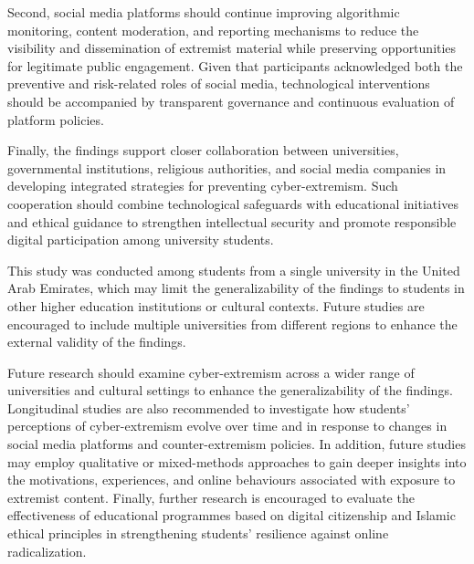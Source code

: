 \documentclass{NSP1}
\begin{document}
Second, social media platforms should continue improving algorithmic monitoring, content moderation, and reporting mechanisms to reduce the visibility and dissemination of extremist material while preserving opportunities for legitimate public engagement. Given that participants acknowledged both the preventive and risk-related roles of social media, technological interventions should be accompanied by transparent governance and continuous evaluation of platform policies.

Finally, the findings support closer collaboration between universities, governmental institutions, religious authorities, and social media companies in developing integrated strategies for preventing cyber-extremism. Such cooperation should combine technological safeguards with educational initiatives and ethical guidance to strengthen intellectual security and promote responsible digital participation among university students.

\par\medskip{}\smallskip

This study was conducted among students from a single university in the United Arab Emirates, which may limit the generalizability of the findings to students in other higher education institutions or cultural contexts. Future studies are encouraged to include multiple universities from different regions to enhance the external validity of the findings.

\par\medskip{}\smallskip

Future research should examine cyber-extremism across a wider range of universities and cultural settings to enhance the generalizability of the findings. Longitudinal studies are also recommended to investigate how students' perceptions of cyber-extremism evolve over time and in response to changes in social media platforms and counter-extremism policies. In addition, future studies may employ qualitative or mixed-methods approaches to gain deeper insights into the motivations, experiences, and online behaviours associated with exposure to extremist content. Finally, further research is encouraged to evaluate the effectiveness of educational programmes based on digital citizenship and Islamic ethical principles in strengthening students' resilience against online radicalization.
\end{document}
